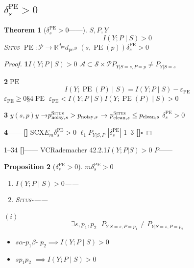 \documentclass[11pt,a4paper]{article}
\newtheorem{theorem}{Theorem}[section]
\newtheorem{proposition}[theorem]{Proposition}
\theoremstyle{remark}
\DeclareMathOperator{\PE}{PE}
\newcommand{\R}{\mathbb{R}}
\newcommand{\Sstates}{\mathcal{S}}
\newcommand{\Ppos}{\mathcal{P}}
\newcommand{\Situs}{\textsc{Situs}}
\newcommand{\pe}{\mathrm{pe}}
\newcommand{\heuristic}{\textnormal{\textbf{[]}}}
\begin{document}
\subsection{$\delta_s^{\PE} > 0$}

\begin{theorem}[$\delta_s^{\PE} > 0$——]
\label{thm:2.2.1}
$S, P, Y$
\begin{equation}
    \boxed{
    I(Y; P \mid S) > 0
    }
\end{equation}
\textbf{}\Situs{}
$\PE: \Ppos \to \R^{d_{\pe}}$$d_{\pe}$$s$
\textbf{}$(s, \PE(p))$$\delta_s^{\PE} > 0$
\end{theorem}

\begin{proof}
\textbf{1}$I(Y; P \mid S) > 0$
$\mathcal{A} \subset \Sstates \times \Ppos$$P_{Y|S=s, P=p} \neq P_{Y|S=s}$

\textbf{2}$\PE$
\begin{equation}
    I(Y; \PE(P) \mid S) = I(Y; P \mid S) - \varepsilon_{\PE}
\end{equation}
$\varepsilon_{\PE} \geq 0$\S4$\PE$
$\varepsilon_{\PE} < I(Y; P \mid S)$$I(Y; \PE(P) \mid S) > 0$

\textbf{3}
$y$$(s, p)$$y$
→$p_{\text{noisy}, s}^{\Situs} > p_{\text{noisy}, s}$
→
$p_{\text{clean}, s}^{\Situs} \leq p_{\text{clean}, s}$
\textbf{}$\delta_s^{\PE} > 0$

\textbf{4——}\heuristic{} 
SCX$E_m$$\delta_s^{\PE} > 0$
$\ell_1$$P_{Y|S,P}$
$|\delta_s^{\PE}|$\textbf{}
\textbf{}1--3
\heuristic{}\hfill $\square$
\end{proof}

\textbf{}1--34
\heuristic{}——
VCRademacher
42.2.1$I(Y;P|S)>0$
$P$——

\begin{proposition}[$\delta_s^{\PE} > 0$]
\label{prop:2.2.1}
$m$$\delta_s^{\PE} > 0$
\begin{enumerate}[label=(\roman*)]
    \item $I(Y; P \mid S) > 0$——
    \item \Situs{}-——
\end{enumerate}
$(i)$
\begin{equation}
    \exists s, p_1, p_2 \text{  } P_{Y|S=s, P=p_1} \neq P_{Y|S=s, P=p_2}
\end{equation}
\end{proposition}

\textbf{}
\begin{itemize}
    \item $s$$\alpha$-$p_1$$\beta$-
          $p_2$$\implies I(Y; P \mid S) > 0$
    \item $s$$p_1$$p_2$
          $\implies I(Y; P \mid S) > 0$
\end{itemize}
\end{document}
